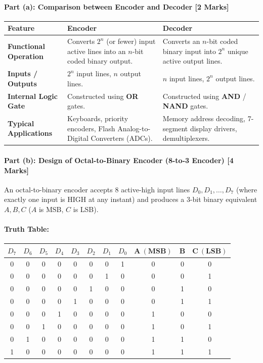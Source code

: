 \documentclass[11pt,a4paper,oneside]{book}
\begin{document}
\paragraph{Part (a): Comparison between Encoder and Decoder [2 Marks]}
\begin{center}
\small
\begin{tabular}{@{}p{3.2cm}p{6.8cm}p{6.8cm}@{}}
\toprule
\textbf{Feature} & \textbf{Encoder} & \textbf{Decoder} \\
\midrule
\textbf{Functional Operation} & Converts $2^n$ (or fewer) input active lines into an $n$-bit coded binary output. & Converts an $n$-bit coded binary input into $2^n$ unique active output lines. \\
\textbf{Inputs / Outputs} & $2^n$ input lines, $n$ output lines. & $n$ input lines, $2^n$ output lines. \\
\textbf{Internal Logic Gate} & Constructed using \textbf{OR} gates. & Constructed using \textbf{AND} / \textbf{NAND} gates. \\
\textbf{Typical Applications} & Keyboards, priority encoders, Flash Analog-to-Digital Converters (ADCs). & Memory address decoding, 7-segment display drivers, demultiplexers. \\
\bottomrule
\end{tabular}
\end{center}

\paragraph{Part (b): Design of Octal-to-Binary Encoder (8-to-3 Encoder) [4 Marks]}
An octal-to-binary encoder accepts 8 active-high input lines $D_0, D_1, \dots, D_7$ (where exactly one input is HIGH at any instant) and produces a 3-bit binary equivalent $A, B, C$ ($A$ is MSB, $C$ is LSB).

\paragraph{Truth Table:}
\begin{center}
\begin{tabular}{|cccccccc||ccc|}
\hline
$D_7$ & $D_6$ & $D_5$ & $D_4$ & $D_3$ & $D_2$ & $D_1$ & $D_0$ & $\mathbf{A\ (MSB)}$ & $\mathbf{B}$ & $\mathbf{C\ (LSB)}$ \\ \hline
0 & 0 & 0 & 0 & 0 & 0 & 0 & 1 & 0 & 0 & 0 \\ \hline
0 & 0 & 0 & 0 & 0 & 0 & 1 & 0 & 0 & 0 & 1 \\ \hline
0 & 0 & 0 & 0 & 0 & 1 & 0 & 0 & 0 & 1 & 0 \\ \hline
0 & 0 & 0 & 0 & 1 & 0 & 0 & 0 & 0 & 1 & 1 \\ \hline
0 & 0 & 0 & 1 & 0 & 0 & 0 & 0 & 1 & 0 & 0 \\ \hline
0 & 0 & 1 & 0 & 0 & 0 & 0 & 0 & 1 & 0 & 1 \\ \hline
0 & 1 & 0 & 0 & 0 & 0 & 0 & 0 & 1 & 1 & 0 \\ \hline
1 & 0 & 0 & 0 & 0 & 0 & 0 & 0 & 1 & 1 & 1 \\ \hline
\end{tabular}
\end{center}
\end{document}
